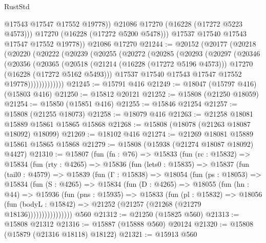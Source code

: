 \begin{lexlean}{RustStd}
\begin{coremodule}
                @17543
                @17547
                @17552
                @19778))
            @21086
            @17270
            (@16228 (@17272 @5223 @4573)))
          @17270
          (@16228 (@17272 @5200 @5478)))
        @17537
        @17540
        @17543
        @17547
        @17552
        @19778))
    @21086
    @17270
@21244 := @20152
    (@20177
      (@20218
        (@20220
          (@20222
            (@20239
              (@20255
                (@20272
                  (@20285
                    (@20293
                      (@20297
                        (@20346
                          (@20356
                            (@20365
                              (@20518
                                (@21214 (@16228 (@17272 @5196 @4573)))
                                @17270
                                (@16228 (@17272 @5162 @5493)))
                              @17537
                              @17540
                              @17543
                              @17547
                              @17552
                              @19778)))))))))))))
@21245 := @15791 @416
@21249 := @18047 (@15797 @416) (@15803 @416)
@21250 := @15812 @20121
@21252 := @15808 (@21250 @18059)
@21254 := @15850 (@15851 @416)
@21255 := @15846 @21254
@21257 := @15808 (@21255 @18073)
@21258 := @18079 @416
@21263 := @21258 @18081 @15889 @15861 @15865 @15868
@21268 := @15808 (@18078 (@21263 @18087 @18092) @18099)
@21269 := @18102 @416
@21274 := @21269 @18081 @15889 @15861 @15865 @15868
@21279 := @15808 (@15938 (@21274 @18087 @18092) @4427)
@21310 := @15807
    (fun (fn : @76) =>
    @15833
      (fun (rc : @15832) =>
      @15834
        (fun (rty : @4265) =>
        @15836
          (fun (lets0 : @15835) =>
          @15837
            (fun (tail0 : @4579) =>
            @15839
              (fun (Γ : @15838) =>
              @18054
                (fun (ps : @18053) =>
                @15834
                  (fun (S : @4265) =>
                  @15834
                    (fun (D : @4265) =>
                    @18055
                      (fun (hn : @44) =>
                      @15936
                        (fun (pns : @15935) =>
                        @15833
                          (fun (pl : @15832) =>
                          @18056
                            (fun (bodyL : @15842) =>
                            @21252 (@21257 (@21268 (@21279 @18136))))))))))))))))
    @560
@21312 := @21250 (@15825 @560)
@21313 := @15808 @21312
@21316 := @15887 (@15888 @560) @20124
@21320 := @15808 (@15879 (@21316 @18118) @18122)
@21321 := @15913 @560

\end{coremodule}
\end{lexlean}
